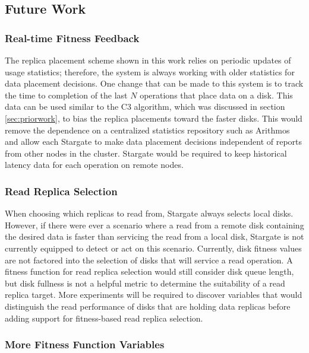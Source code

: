 \documentclass[12pt]{article}
\begin{document}
  \subsection{Future Work}

    \subsubsection{Real-time Fitness Feedback}

    The replica placement scheme shown in this work relies on periodic updates
    of usage statistics; therefore, the system is always working with older
    statistics for data placement decisions. One change that can be made to this
    system is to track the time to completion of the last $N$ operations that
    place data on a disk. This data can be used similar to the C3 algorithm,
    which was discussed in section \ref{sec:priorwork}, to bias the replica placements
    toward the faster disks. This would remove the dependence on a centralized
    statistics repository such as Arithmos and allow each Stargate to make data
    placement decisions independent of reports from other nodes in the cluster.
    Stargate would be required to keep historical latency data for each
    operation on remote nodes.

    \subsubsection{Read Replica Selection}

    When choosing which replicas to read from, Stargate always selects local
    disks. However, if there were ever a scenario where a read from a remote
    disk containing the desired data is faster than servicing the read from a
    local disk, Stargate is not currently equipped to detect or act on this
    scenario. Currently, disk fitness values are not factored into the selection
    of disks that will service a read operation. A fitness function for read
    replica selection would still consider disk queue length, but disk fullness
    is not a helpful metric to determine the suitability of a read replica
    target. More experiments will be required to discover variables that would
    distinguish the read performance of disks that are holding data replicas before
    adding support for fitness-based read replica selection.
    
    \subsubsection{More Fitness Function Variables}
\end{document}

